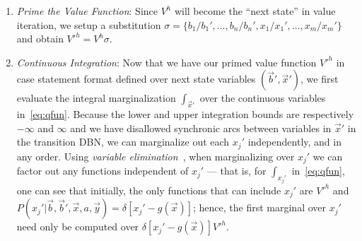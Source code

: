 \documentclass[letterpaper]{article}
\begin{document}
\begin{enumerate}
\item {\it Prime the Value Function}: Since $V^{h}$ will become
the ``next state'' in value iteration, we setup a substitution
$\sigma = \{ b_1 / b_1', \ldots, b_n / b_n', x_1 / x_1', \ldots, x_m / x_m' \}$
and obtain $V'^{h} = V^{h}\sigma$.

\item {\it Continuous Integration}: Now that we have our primed value
function $V'^{h}$ in case statement format defined over next state
variables $(\vec{b}',\vec{x}')$, we first evaluate the integral
marginalization $\int_{\vec{x}'}$ over the continuous variables
in~\eqref{eq:qfun}.  Because the lower and upper integration bounds
are respectively $-\infty$ and $\infty$
and we have
disallowed synchronic arcs between variables in $\vec{x}'$ 
in the transition DBN, we can marginalize out each
$x_j'$ independently, and in any order.  Using 
\emph{variable elimination}~\cite{varelim}, when marginalizing
over $x_j'$ we can factor out any functions independent of $x_j'$ --- 
that is, for $\int_{x_j'}$ in~\eqref{eq:qfun}, 
one can see that initially, 
the only functions that can include $x_j'$ are $V'^{h}$
and $P(x_j'|\vec{b},\vec{b}',\vec{x},a,\vec{y}) = \delta[x_j' - g(\vec{x})]$; 
hence, the first marginal over $x_j'$ need only be computed over
$\delta[x_j' - g(\vec{x})] V'^{h}$.


\end{enumerate}
\end{document}
